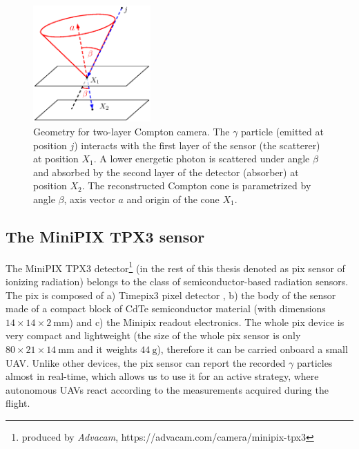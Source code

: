 \begin{figure}[!h]
  \centering
    \includegraphics[width=0.4\textwidth]{./fig/photos/compton_camera_modelll.eps}
    \caption{Geometry for two-layer Compton camera. The $\gamma$ particle (emitted at position $j$) interacts with the first layer of the sensor (the scatterer) at position $X_{1}$. A lower energetic photon is scattered under angle $\beta$ and absorbed by the second layer of the detector (absorber) at position $X_{2}$. The reconstructed Compton cone is parametrized by angle $\beta$, axis vector $a$ and origin of the cone $X_{1}$.}
    \label{fig:compton_camera_geometry}
\end{figure}

\subsection{The MiniPIX TPX3 sensor} %
The MiniPIX TPX3 detector\footnote{produced by \textit{Advacam}, https://advacam.com/camera/minipix-tpx3} (in the rest of this thesis denoted as \ac{pix} sensor of ionizing radiation) belongs to the class of semiconductor-based radiation sensors.
The \ac{pix} is composed of a) Timepix3 pixel detector \cite{timepix3},
b) the body of the sensor made of a compact block of \ac{CdTe} semiconductor material (with dimensions $14 \times 14 \times 2 \ \si{\milli\meter}$) 
and c) the Minipix readout electronics.
The whole \ac{pix} device is very compact and lightweight (the size of the whole \ac{pix} sensor is only $80 \times 21 \times 14 \ \si{\milli\meter}$ and it weights $\SI{44}{\gram}$), therefore it can be carried onboard a small \ac{UAV}.
Unlike other devices, the \ac{pix} sensor can report the recorded $\gamma$ particles almost in real-time, which allows us to use it for an active strategy, where autonomous \ac{UAV}s react according to the measurements acquired during the flight.

